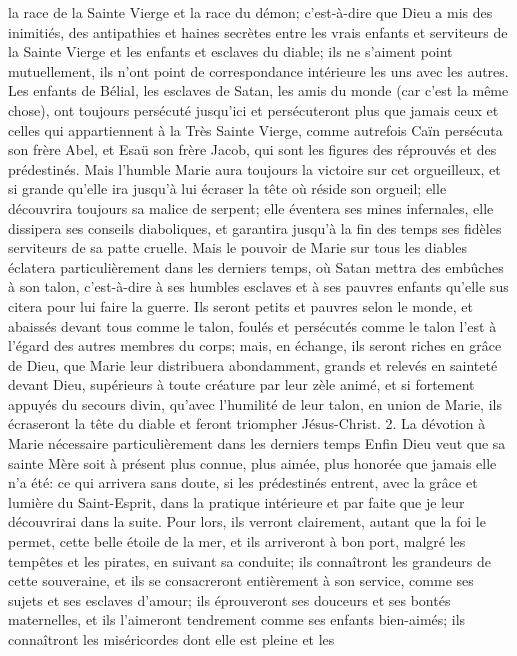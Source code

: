 la race de la Sainte Vierge et la race du démon; c'est-à-dire que Dieu a mis des inimitiés, des antipathies et haines
secrètes entre les vrais enfants et serviteurs de la Sainte Vierge et les enfants et esclaves du diable; ils ne
s'aiment point mutuellement, ils n'ont point de correspondance intérieure les uns avec les autres. Les enfants de
Bélial, les esclaves de Satan, les amis du monde (car c'est la même chose), ont toujours persécuté jusqu'ici et
persécuteront plus que jamais ceux et celles qui appartiennent à la Très Sainte Vierge, comme autrefois Caïn
persécuta son frère Abel, et Esaü son frère Jacob, qui sont les figures des réprouvés et des prédestinés. Mais
l'humble Marie aura toujours la victoire sur cet orgueilleux, et si grande qu'elle ira jusqu'à lui écraser la tête où
réside son orgueil; elle découvrira toujours sa malice de serpent; elle éventera ses mines infernales, elle dissipera
ses conseils diaboliques, et garantira jusqu'à la fin des temps ses fidèles serviteurs de sa patte cruelle.
Mais le pouvoir de Marie sur tous les diables éclatera particulièrement dans les derniers temps, où Satan mettra
des embûches à son talon, c'est-à-dire à ses humbles esclaves et à ses pauvres enfants qu'elle sus citera pour lui
faire la guerre. Ils seront petits et pauvres selon le monde, et abaissés devant tous comme le talon, foulés et
persécutés comme le talon l'est à l'égard des autres membres du corps; mais, en échange, ils seront riches en
grâce de Dieu, que Marie leur distribuera abondamment, grands et relevés en sainteté devant Dieu, supérieurs à
toute créature par leur zèle animé, et si fortement appuyés du secours divin, qu'avec l'humilité de leur talon, en
union de Marie, ils écraseront la tête du diable et feront triompher Jésus-Christ.
2. La dévotion à Marie nécessaire
particulièrement dans les derniers temps
 Enfin Dieu veut que sa sainte Mère soit à présent plus connue, plus aimée, plus honorée que jamais elle n'a
été: ce qui arrivera sans doute, si les prédestinés entrent, avec la grâce et lumière du Saint-Esprit, dans la pratique
intérieure et par faite que je leur découvrirai dans la suite. Pour lors, ils verront clairement, autant que la foi le
permet, cette belle étoile de la mer, et ils arriveront à bon port, malgré les tempêtes et les pirates, en suivant sa
conduite; ils connaîtront les grandeurs de cette souveraine, et ils se consacreront entièrement à son service,
comme ses sujets et ses esclaves d'amour; ils éprouveront ses douceurs et ses bontés maternelles, et ils
l'aimeront tendrement comme ses enfants bien-aimés; ils connaîtront les miséricordes dont elle est pleine et les
